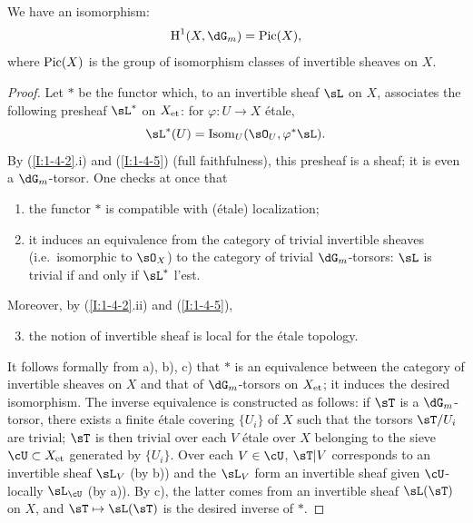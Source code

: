 \begin{proposition}\label{I:2-2-3}
We have an isomorphism:
\[
  \h^1(X,\dG_m) = \pic(X)\text{,}
\]
where $\operatorname{Pic}(X)$ is the group of isomorphism classes of invertible sheaves on $X$.
\end{proposition}
\begin{proof}
Let $*$ be the functor which, to an invertible sheaf $\sL$ on $X$, associates the 
following presheaf $\sL^*$ on ${X}_{\textnormal{et}}$: for $\varphi:U\to X$ \'etale, 
\[
  \sL^*(U)=\operatorname{Isom}_U(\sO_U,\varphi^*\sL)\text{.}
\]
By (\ref{I:1-4-2}.i) and (\ref{I:1-4-5}) (full faithfulness), this 
presheaf is a sheaf; it is even a $\dG_m$-torsor. One checks 
at once that 
\begin{enumerate}[\indent a)]
  \item the functor $*$ is compatible with (\'etale) localization;
  \item it induces an equivalence from the category of 
    trivial invertible sheaves (i.e.\ isomorphic to $\sO_X$) to the category of 
    trivial $\dG_m$-torsors: $\sL$ is trivial if and only if $\sL^*$ 
    l'est.
\end{enumerate}

Moreover, by (\ref{I:1-4-2}.ii) and (\ref{I:1-4-5}), 
\begin{enumerate}[\indent a)]
\setcounter{enumi}{2}
  \item the notion of invertible sheaf is local for the \'etale topology. 
\end{enumerate}

It follows formally from a), b), c) that $*$ is an equivalence between the 
category of invertible sheaves on $X$ and that of $\dG_m$-torsors 
on ${X}_{\textnormal{et}}$; it induces the desired isomorphism. The inverse 
equivalence is constructed as follows: if $\sT$ is a $\dG_m$-torsor, there exists a 
finite \'etale covering $\{U_i\}$ of $X$ such that the torsors $\sT/U_i$ are 
trivial; $\sT$ is then trivial over each $V$ \'etale over $X$ belonging to the 
sieve $\cU\subset \et X$ generated by $\{U_i\}$. Over each 
$V\in\cU$, $\sT|V$ corresponds to an invertible sheaf $\sL_V$ (by b)) and the 
$\sL_V$ form an invertible sheaf given $\cU$-locally $\sL_\cU$ 
(by a)). By c), the latter comes from an invertible sheaf $\sL(\sT)$ on 
$X$, and $\sT\mapsto \sL(\sT)$ is the desired inverse of $*$. 
\end{proof}





